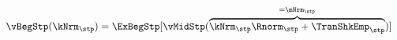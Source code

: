   \begin{equation}\begin{gathered}\begin{aligned}
\vBegStp(\kNrm_{\stp}) & = \ExBegStp[\vMidStp(\overbrace{\kNrm_{\stp} \Rnorm_{\stp} + \TranShkEmp_{\stp}}^{=\mNrm_{\stp}})]  \label{eq:vBegStp}
      \end{aligned}\end{gathered}\end{equation}
